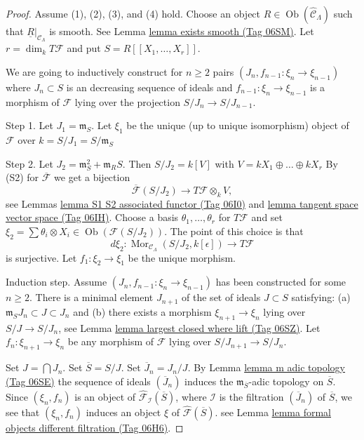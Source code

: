 \documentclass{amsart}
\theoremstyle{plain}
\theoremstyle{definition}
\theoremstyle{remark}
\numberwithin{equation}{subsection}
\def\Mor{\mathop{\mathrm{Mor}}\nolimits}
\def\Ob{\mathop{\mathrm{Ob}}\nolimits}
\begin{document}
\begin{proof}
Assume (1), (2), (3), and (4) hold. Choose an object
$R \in \Ob(\widehat{\mathcal{C}}_\Lambda)$
such that $\underline{R}|_{\mathcal{C}_\Lambda}$ is smooth.
See Lemma \href{https://stacks.math.columbia.edu/tag/06SM}{lemma exists smooth (Tag 06SM)}.
Let $r = \dim_k T\mathcal{F}$ and put $S = R[[X_1, \ldots, X_r]]$.

\medskip\noindent
We are going to inductively construct for $n \geq 2$ pairs
$(J_n, f_{n - 1} : \xi_n \to \xi_{n - 1})$
where $J_n \subset S$ is an decreasing sequence of ideals and
$f_{n - 1} : \xi_n \to \xi_{n - 1}$ is a morphism of
$\mathcal{F}$ lying over the projection $S/J_n \to S/J_{n - 1}$.

\medskip\noindent
Step 1. Let $J_1 = \mathfrak m_S$. Let $\xi_1$ be the unique
(up to unique isomorphism) object of $\mathcal{F}$ over
$k = S/J_1 = S/\mathfrak m_S$

\medskip\noindent
Step 2. Let
$J_2 = \mathfrak m_S^2 + \mathfrak{m}_R S$. Then
$S/J_2 = k[V]$ with $V = kX_1 \oplus \ldots \oplus kX_r$
By (S2) for $\overline{\mathcal{F}}$ we get a bijection
$$
\overline{\mathcal{F}}(S/J_2)
\longrightarrow
T\mathcal{F} \otimes_k V,
$$
see
Lemmas \href{https://stacks.math.columbia.edu/tag/06I0}{lemma S1 S2 associated functor (Tag 06I0)} and
\href{https://stacks.math.columbia.edu/tag/06IH}{lemma tangent space vector space (Tag 06IH)}.
Choose a basis $\theta_1, \ldots, \theta_r$ for $T\mathcal{F}$ and set
$\xi_2 = \sum \theta_i \otimes X_i \in \Ob(\mathcal{F}(S/J_2))$.
The point of this choice is that
$$
d\xi_2 :
\Mor_{\mathcal{C}_\Lambda}(S/J_2, k[\epsilon])
\longrightarrow
T\mathcal{F}
$$
is surjective. Let $f_1 : \xi_2 \to \xi_1$ be the unique morphism.

\medskip\noindent
Induction step. Assume $(J_n, f_{n - 1} : \xi_n \to \xi_{n - 1})$ has been
constructed for some $n \geq 2$. There is a minimal element $J_{n + 1}$ of
the set of ideals $J \subset S$ satisfying:
(a) $\mathfrak m_S J_n \subset J \subset J_n$ and
(b) there exists a morphism $\xi_{n + 1} \to \xi_n$ lying over
$S/J \to S/J_n$, see
Lemma \href{https://stacks.math.columbia.edu/tag/06SZ}{lemma largest closed where lift (Tag 06SZ)}.
Let $f_n : \xi_{n + 1} \to \xi_n$ be any morphism of $\mathcal{F}$
lying over $S/J_{n + 1} \to S/J_n$.

\medskip\noindent
Set $J = \bigcap J_n$. Set $\overline{S} = S/J$. Set $\overline{J}_n = J_n/J$.
By
Lemma \href{https://stacks.math.columbia.edu/tag/06SE}{lemma m adic topology (Tag 06SE)}
the sequence of ideals $(\overline{J}_n)$ induces the
$\mathfrak m_{\overline{S}}$-adic topology on $\overline{S}$.
Since $(\xi_n, f_n)$ is an object of
$\widehat{\mathcal{F}}_\mathcal{I}(\overline{S})$, where $\mathcal{I}$
is the filtration $(\overline{J}_n)$ of $\overline{S}$,
we see that $(\xi_n, f_n)$
induces an object $\xi$ of $\widehat{\mathcal{F}}(\overline{S})$.
see
Lemma \href{https://stacks.math.columbia.edu/tag/06H6}{lemma formal objects different filtration (Tag 06H6)}.


\end{proof}
\end{document}
